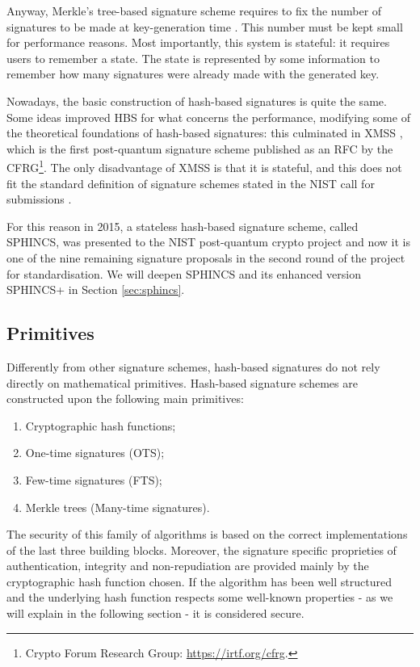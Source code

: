 \documentclass[a4paper,12pt]{article}
\begin{document}
Anyway, Merkle's tree-based signature scheme requires to fix the number of signatures to be made at key-generation time \cite{2_SPHINCS+_round2}. This number must be kept small for performance reasons. Most importantly, this system is stateful: it requires users to remember a state. The state is represented by some information to remember how many signatures were already made with the generated key.

Nowadays, the basic construction of hash-based signatures is quite the same. 
Some ideas improved HBS for what concerns the performance, modifying some of the theoretical foundations of hash-based signatures: this culminated in XMSS \cite{32_XMSS}, which is the first post-quantum signature scheme published as an RFC \cite{33_RFC_XMSS} by the CFRG\footnote{Crypto Forum Research Group: \url{https://irtf.org/cfrg}.}.
The only disadvantage of XMSS is that it is stateful, and this does not fit the standard definition of signature schemes stated in the NIST call for submissions \cite{2_SPHINCS+_round2}.

For this reason in 2015, a stateless hash-based signature scheme, called SPHINCS, was presented to the NIST post-quantum crypto project and now it is one of the nine remaining signature proposals in the second round of the project for standardisation. We will deepen SPHINCS and its enhanced version SPHINCS+ in Section \ref{sec:sphincs}.


\subsection{Primitives}
\label{sub:primitives}

Differently from other signature schemes, hash-based signatures do not rely directly on mathematical primitives.
Hash-based signature schemes are constructed upon the following main primitives:
\begin{enumerate}
	\item Cryptographic hash functions;
	\item One-time signatures (OTS);
	\item Few-time signatures (FTS);
	\item Merkle trees (Many-time signatures).
\end{enumerate}

The security of this family of algorithms is based on the correct implementations of the last three building blocks. Moreover, the signature specific proprieties of authentication, integrity and non-repudiation are provided mainly by the cryptographic hash function chosen. If the algorithm has been well structured and the underlying hash function respects some well-known properties - as we will explain in the following section - it is considered secure.
\end{document}
